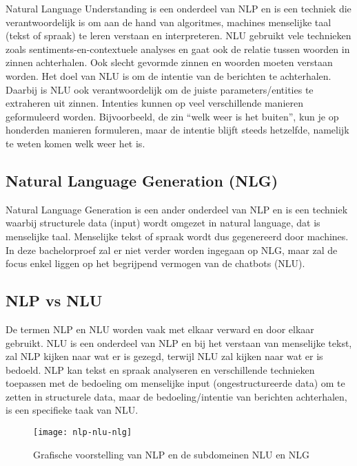 Natural Language Understanding is een onderdeel van NLP en is een techniek die verantwoordelijk is om aan de hand van algoritmes, machines menselijke taal (tekst of spraak) te leren verstaan en interpreteren. NLU gebruikt vele technieken zoals sentiments-en-contextuele analyses en gaat ook de relatie tussen woorden in zinnen achterhalen. Ook slecht gevormde zinnen en woorden moeten verstaan worden. Het doel van NLU is om de intentie van de berichten te achterhalen. Daarbij is NLU ook verantwoordelijk om de juiste parameters/entities te extraheren uit zinnen. Intenties kunnen op veel verschillende manieren geformuleerd worden. Bijvoorbeeld, de zin “welk weer is het buiten”,  kun je op honderden manieren formuleren, maar de intentie blijft steeds hetzelfde, namelijk te weten komen welk weer het is.


\subsection{Natural Language Generation (NLG)}
\label{subsec:nlp-nlg}


Natural Language Generation is een ander onderdeel van NLP en is een techniek waarbij structurele data (input) wordt omgezet in natural language, dat is menselijke taal. Menselijke tekst of spraak wordt dus gegenereerd door machines. In deze bachelorproef zal er niet verder worden ingegaan op NLG, maar zal de focus enkel liggen op het begrijpend vermogen van de chatbots (NLU).


\subsection{NLP vs NLU}
\label{subsec:nlp-nlp-vs-nlu}


De termen NLP en NLU worden vaak met elkaar verward en door elkaar gebruikt. NLU is een onderdeel van NLP en bij het verstaan van menselijke tekst, zal NLP kijken naar wat er is gezegd, terwijl NLU zal kijken naar wat er is bedoeld. NLP kan tekst en spraak analyseren en verschillende technieken toepassen met de bedoeling om menselijke input (ongestructureerde data) om te zetten in structurele data, maar de bedoeling/intentie van berichten achterhalen, is een specifieke taak van NLU. 

\begin{figure}[!htbp]
    \label{fig:nlp-nlu-nlg}
    \centering
    \texttt{[image: nlp-nlu-nlg]}
    \caption{Grafische voorstelling van NLP en de subdomeinen NLU en NLG \autocite{Sciforce2019}}
\end{figure}

